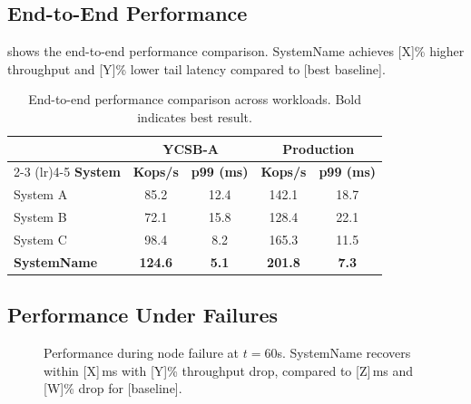 \documentclass[sigplan,10pt]{acmart}
\newcommand{\system}{SystemName\xspace}
\newcommand{\ms}{\,ms\xspace}
\begin{document}
\subsection{End-to-End Performance}
\label{sec:eval:e2e}

 shows the end-to-end performance comparison.
\system achieves [X]\% higher throughput and [Y]\% lower tail
latency compared to [best baseline].

\begin{table}[t]
  \caption{End-to-end performance comparison across workloads.
    Bold indicates best result.}
  \label{tab:e2e}
  \centering
  \begin{small}
  \begin{tabular}{@{}lcccc@{}}
    \toprule
    & \multicolumn{2}{c}{\textbf{YCSB-A}} &
      \multicolumn{2}{c}{\textbf{Production}} \\
    \cmidrule(lr){2-3} \cmidrule(lr){4-5}
    \textbf{System} & \textbf{Kops/s} & \textbf{p99 (ms)} &
    \textbf{Kops/s} & \textbf{p99 (ms)} \\
    \midrule
    System A         & 85.2   & 12.4  & 142.1  & 18.7 \\
    System B         & 72.1   & 15.8  & 128.4  & 22.1 \\
    System C         & 98.4   & 8.2   & 165.3  & 11.5 \\
    \textbf{\system} & \textbf{124.6} & \textbf{5.1} &
                       \textbf{201.8} & \textbf{7.3} \\
    \bottomrule
  \end{tabular}
  \end{small}
\end{table}

\subsection{Performance Under Failures}
\label{sec:eval:failure}

\begin{figure}[t]
  \centering
  \caption{Performance during node failure at $t=60$s. \system
    recovers within [X]\ms with [Y]\% throughput drop, compared
    to [Z]\ms and [W]\% drop for [baseline].}
  \label{fig:failure}
\end{figure}
\end{document}

